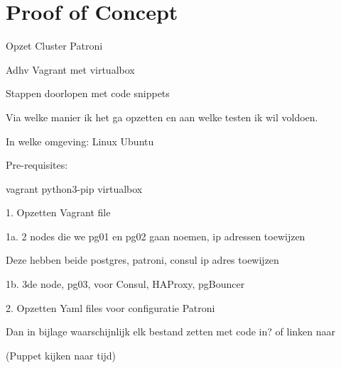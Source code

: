 
\chapter{Proof of Concept}

\label{ch:Proof of Concept}



Opzet Cluster Patroni

Adhv Vagrant met virtualbox

Stappen doorlopen met code snippets

Via welke manier ik het ga opzetten en aan welke testen ik wil voldoen.

In welke omgeving: Linux Ubuntu

Pre-requisites:

vagrant
python3-pip
virtualbox


1. Opzetten Vagrant file

1a. 2 nodes die we pg01 en pg02 gaan noemen, ip adressen toewijzen

Deze hebben beide postgres, patroni, consul
ip adres toewijzen

1b. 3de node, pg03, voor Consul, HAProxy, pgBouncer


2. Opzetten Yaml files voor configuratie Patroni





Dan in bijlage waarschijnlijk elk bestand zetten met code in?
of linken naar 




(Puppet kijken naar tijd)
